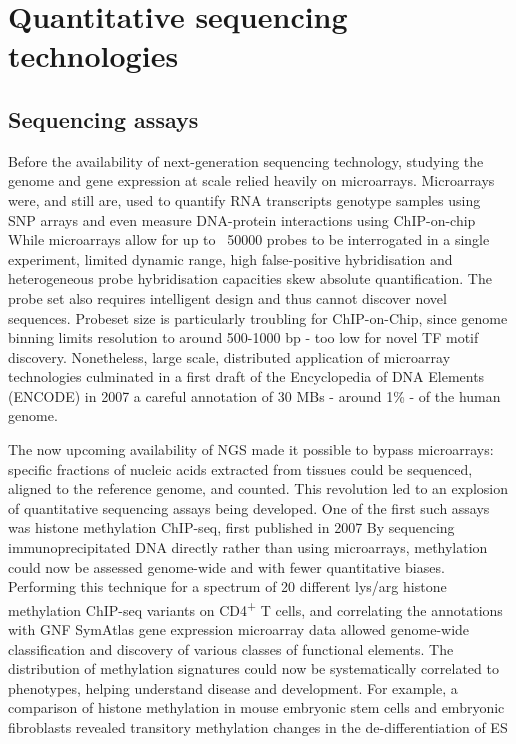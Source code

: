 \chapter{Quantitative sequencing technologies}
\label{ch:quantitative}

\section{Sequencing assays}
Before the availability of next-generation sequencing technology, studying the genome and gene expression at scale relied heavily on microarrays. Microarrays were, and still are, used to quantify RNA transcripts genotype samples using SNP arrays and even measure DNA-protein interactions using ChIP-on-chip While microarrays allow for up to ~\num{50000} probes to be interrogated in a single experiment, limited dynamic range, high false-positive hybridisation and heterogeneous probe hybridisation capacities skew absolute quantification. The probe set also requires intelligent design and thus cannot discover novel sequences. Probeset size is particularly troubling for ChIP-on-Chip, since genome binning limits resolution to around 500-1000 bp - too low for novel TF motif discovery. Nonetheless, large scale, distributed application of microarray technologies culminated in a first draft of the Encyclopedia of DNA Elements (ENCODE) in 2007 a careful annotation of 30 MBs - around 1\% - of the human genome.


The now upcoming availability of NGS made it possible to bypass microarrays: specific fractions of nucleic acids extracted from tissues could be sequenced, aligned to the reference genome, and counted. This revolution led to an explosion of quantitative sequencing assays being developed. One of the first such assays was histone methylation ChIP-seq, first published in 2007 By sequencing immunoprecipitated DNA directly rather than using microarrays, methylation could now be assessed genome-wide and with fewer quantitative biases. Performing this technique for a spectrum of 20 different lys/arg histone methylation ChIP-seq variants on CD4\textsuperscript{+} T cells, and correlating the annotations with GNF SymAtlas gene expression microarray data allowed genome-wide classification and discovery of various classes of functional elements. The distribution of methylation signatures could now be systematically correlated to phenotypes, helping understand disease and development. For example, a comparison of histone methylation in mouse embryonic stem cells and embryonic fibroblasts revealed transitory methylation changes in the de-differentiation of ES

